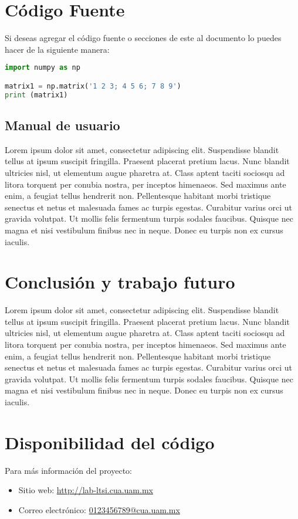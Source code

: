 \documentclass[a4paper, 11pt]{article}
\begin{document}
\section{Código Fuente}
Si deseas agregar el código fuente o secciones de este al documento lo puedes hacer de la siguiente manera: 
\begin{lstlisting}[language=Python, caption=Código Python {\tt main.py},label={lst:main}]
import numpy as np

matrix1 = np.matrix('1 2 3; 4 5 6; 7 8 9')
print (matrix1)

\end{lstlisting} 

\subsection{Manual de usuario}
Lorem ipsum dolor sit amet, consectetur adipiscing elit. Suspendisse blandit tellus at ipsum suscipit fringilla. Praesent placerat pretium lacus. Nunc blandit ultricies nisl, ut elementum augue pharetra at. Class aptent taciti sociosqu ad litora torquent per conubia nostra, per inceptos himenaeos. Sed maximus ante enim, a feugiat tellus hendrerit non. Pellentesque habitant morbi tristique senectus et netus et malesuada fames ac turpis egestas. Curabitur varius orci ut gravida volutpat. Ut mollis felis fermentum turpis sodales faucibus. Quisque nec magna et nisi vestibulum finibus nec in neque. Donec eu turpis non ex cursus iaculis.

\section{Conclusión y trabajo futuro}
Lorem ipsum dolor sit amet, consectetur adipiscing elit. Suspendisse blandit tellus at ipsum suscipit fringilla. Praesent placerat pretium lacus. Nunc blandit ultricies nisl, ut elementum augue pharetra at. Class aptent taciti sociosqu ad litora torquent per conubia nostra, per inceptos himenaeos. Sed maximus ante enim, a feugiat tellus hendrerit non. Pellentesque habitant morbi tristique senectus et netus et malesuada fames ac turpis egestas. Curabitur varius orci ut gravida volutpat. Ut mollis felis fermentum turpis sodales faucibus. Quisque nec magna et nisi vestibulum finibus nec in neque. Donec eu turpis non ex cursus iaculis.

\section{Disponibilidad del código} 
Para más información del proyecto: 
\begin{itemize}
	\item Sitio web: \href{http://lab-ltsi.cua.uam.mx}{http://lab-ltsi.cua.uam.mx}
	\item Correo electrónico: \href{mailto:someone@cua.uam.mx}{0123456789@cua.uam.mx}
\end{itemize}\ \
\end{document}
